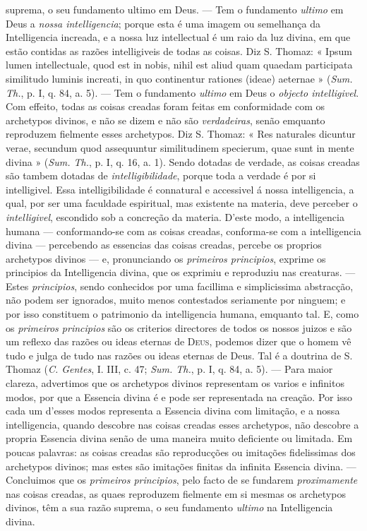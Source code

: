 suprema, o seu fundamento ultimo em Deus. --- Tem o fundamento \emph{ultimo} em Deus a \emph{nossa intelligencia}; porque esta é uma imagem ou semelhança da Intelligencia increada, e a nossa luz intellectual é um raio da luz divina, em que estão contidas as razões intelligiveis de todas as coisas. Diz S. Thomaz: « Ipsum lumen intellectuale, quod est in nobis, nihil est aliud quam quaedam participata similitudo luminis increati, in quo continentur rationes (ideae) aeternae » (\emph{Sum. Th.}, p. I, q. 84, a. 5). --- Tem o fundamento \emph{ultimo} em Deus o \emph{objecto intelligivel}. Com effeito, todas as coisas creadas foram feitas em conformidade com os archetypos divinos, e não se dizem e não são \emph{verdadeiras}, senão emquanto reproduzem fielmente esses archetypos. Diz S. Thomaz: « Res naturales dicuntur verae, secundum quod assequuntur similitudinem specierum, quae sunt in mente divina » (\emph{Sum. Th.}, p. I, q. 16, a. 1). Sendo dotadas de verdade, as coisas creadas são tambem dotadas de \emph{intelligibilidade}, porque toda a verdade é por si intelligivel. Essa intelligibilidade é connatural e accessivel á nossa intelligencia, a qual, por ser uma faculdade espiritual, mas existente na materia, deve perceber o \emph{intelligivel}, escondido sob a concreção da materia. D'este modo, a intelligencia humana --- conformando-se com as coisas creadas, conforma-se com a intelligencia divina --- percebendo as essencias das coisas creadas, percebe os proprios archetypos divinos --- e, pronunciando os \emph{primeiros principios}, exprime os principios da Intelligencia divina, que os exprimiu e reproduziu nas creaturas. --- Estes \emph{principios}, sendo conhecidos por uma facillima e simplicissima abstracção, não podem ser ignorados, muito menos contestados seriamente por ninguem; e por isso constituem o patrimonio da intelligencia humana, emquanto tal. E, como os \emph{primeiros principios} são os criterios directores de todos os nossos juizos e são um reflexo das razões ou ideas eternas de \textsc{Deus}, podemos dizer que o homem vê tudo e julga de tudo nas razões ou ideas eternas de Deus. Tal é a doutrina de S. Thomaz (\emph{C. Gentes}, I. III, c. 47; \emph{Sum. Th.}, p. I, q. 84, a. 5). --- Para maior clareza, advertimos que os archetypos divinos representam os varios e infinitos modos, por que a Essencia divina é e pode ser representada na creação. Por isso cada um d'esses modos representa a Essencia divina com limitação, e a nossa intelligencia, quando descobre nas coisas creadas esses archetypos, não descobre a propria Essencia divina senão de uma maneira muito deficiente ou limitada. Em poucas palavras: as coisas creadas são reproducções ou imitações fidelissimas dos archetypos divinos; mas estes são imitações finitas da infinita Essencia divina. --- Concluimos que os \emph{primeiros principios}, pelo facto de se fundarem \emph{proximamente} nas coisas creadas, as quaes reproduzem fielmente em si mesmas os archetypos divinos, têm a sua razão suprema, o seu fundamento \emph{ultimo} na Intelligencia divina.

